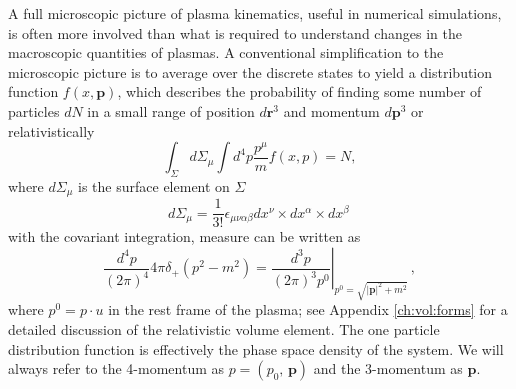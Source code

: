 \label{sec:CKT}
A full microscopic picture of plasma kinematics, useful in numerical simulations, is often more involved than what is required to understand changes in the macroscopic quantities of plasmas. A conventional simplification to the microscopic picture is to average over the discrete states to yield a distribution function $f(x,\boldsymbol{p})$, which describes the probability of finding some number of particles $dN$ in a small range of position $d\mathbf{r}^3$ and momentum $d\boldsymbol{p}^3$ or relativistically~\cite{Hakim:2011bk}
\begin{equation}
    \int_{\Sigma}d\Sigma_{\mu}\int  d^4p\frac{p^\mu}{m}f(x,p) = N,
\end{equation}
where $d\Sigma_\mu$ is the surface element on $\Sigma$
\begin{equation}
    d\Sigma_\mu = \frac{1}{3!}\epsilon_{\mu \nu \alpha\beta} dx^\nu \times dx^\alpha\times dx^\beta\,
\end{equation}
with the covariant integration, measure can be written as
\begin{equation}\label{eq:measure} 
 \frac{d^4p}{(2\pi)^4}4\pi \delta_+(p^2-m^2) = \left.\frac{d^3p}{(2\pi)^3p^0}\right|_{p^0 = \sqrt{|\boldsymbol{p}|^2 + m^2}} \,,
\end{equation}
where $p^0 = p \cdot u$ in the rest frame of the plasma; see Appendix \ref{ch:vol:forms} for a detailed discussion of the relativistic volume element. The one particle distribution function is effectively the phase space density of the system. We will always refer to the 4-momentum as $p = (p_0, \, \boldsymbol{p})$ and the 3-momentum as $\boldsymbol{p}$.

